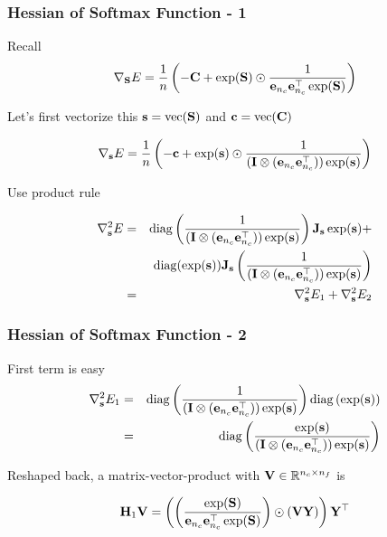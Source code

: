 \documentclass[12pt,fleqn,handout]{beamer}
\begin{document}
\begin{frame}[fragile]\frametitle{Hessian of Softmax Function - 1}

Recall
$$ \nabla_{\bf S} E = \frac{1}{n} \left(-{\bf C} + \exp({\bf S})  \odot \frac 1 {{\bf e}_{n_c}{\bf e}_{n_c}^\top\exp({\bf S})} \right) $$

Let's first vectorize this  ${\bf s} = {\rm vec}({\bf S})$ and ${\bf c} = {\rm vec}({\bf C})$

$$ \nabla_{\bf s} E = \frac{1}{n} \left(- {\bf c} + \exp({\bf s})  \odot \frac{1 }{({\bf I} \otimes ({\bf e}_{n_c} {\bf e}_{n_c}^{\top}))\exp({\bf s})} \right) $$

\bigskip
\pause

Use product rule

\begin{eqnarray*}
\nabla^2_{\bf s} E &=& {\rm diag} \left( {\frac 1 {({\bf I} \otimes ({\bf e}_{n_c} {\bf e}_{n_c}^{\top})) \exp({\bf s})}} \right)
{\bf J}_{\bf s}  \exp({\bf s})   +  \\
&&
{\rm diag} (\exp ({\bf s})) {\bf J}_{\bf s} \left( {\frac 1 {({\bf I} \otimes ({\bf e}_{n_c} {\bf e}_{n_c}^{\top})) \exp({\bf s})}} \right)\\
&=& \nabla^2_{\bf s} E_1 + \nabla^2_{\bf s} E_2
\end{eqnarray*}
\end{frame}


\begin{frame}[fragile]\frametitle{Hessian of Softmax Function - 2}

First term is easy
\begin{eqnarray*}
\nabla^2_{{\bf s}} E_1 &=& {\rm diag} \left( {\frac 1 {({\bf I}\otimes ({\bf e}_{n_c} {\bf e}_{n_c}^{\top})) \exp({\bf s})}} \right)
{\rm diag} \left( \exp({\bf s})\right) \\
&=&
{\rm diag} \left( {\frac {\exp({\bf s})} {({\bf I} \otimes ({\bf e}_{n_c} {\bf e}_{n_c}^{\top})) \exp({\bf s})}} \right) 
\end{eqnarray*}
\pause
\bigskip


Reshaped back, a matrix-vector-product with ${\bf V} \in \mathbb{R}^{n_c \times n_f}$ is

$$ {\bf H}_1 {\bf V} =   \left( \left( {\frac {\exp({\bf S})} {{\bf e}_{n_c}{\bf e}_{n_c}^\top \exp({\bf S})}} \right) \odot ( {\bf V} {\bf Y}) \right) {\bf Y}^{\top} $$

\end{frame}
\end{document}
